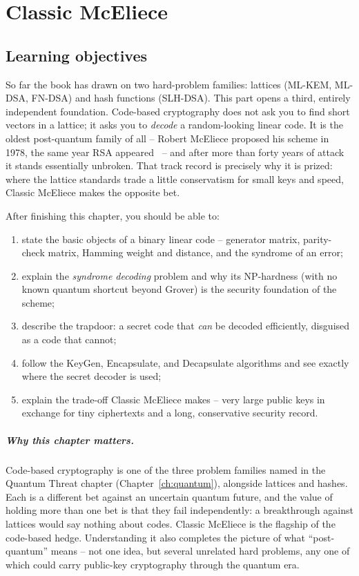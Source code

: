 \chapter{Classic McEliece}
\label{ch:mceliece}

\section{Learning objectives}

So far the book has drawn on two hard-problem families: lattices (ML-KEM, ML-DSA, FN-DSA) and hash functions (SLH-DSA). This part opens a third, entirely independent foundation. Code-based cryptography does not ask you to find short vectors in a lattice; it asks you to \emph{decode} a random-looking linear code. It is the oldest post-quantum family of all -- Robert McEliece proposed his scheme in 1978, the same year RSA appeared~\cite{mceliece1978} -- and after more than forty years of attack it stands essentially unbroken. That track record is precisely why it is prized: where the lattice standards trade a little conservatism for small keys and speed, Classic McEliece makes the opposite bet.

After finishing this chapter, you should be able to:

\begin{enumerate}
  \item state the basic objects of a binary linear code -- generator matrix, parity-check matrix, Hamming weight and distance, and the syndrome of an error;
  \item explain the \emph{syndrome decoding} problem and why its NP-hardness (with no known quantum shortcut beyond Grover) is the security foundation of the scheme;
  \item describe the trapdoor: a secret code that \emph{can} be decoded efficiently, disguised as a code that cannot;
  \item follow the KeyGen, Encapsulate, and Decapsulate algorithms and see exactly where the secret decoder is used;
  \item explain the trade-off Classic McEliece makes -- very large public keys in exchange for tiny ciphertexts and a long, conservative security record.
\end{enumerate}

\paragraph{Why this chapter matters.}
Code-based cryptography is one of the three problem families named in the Quantum Threat chapter (Chapter~\ref{ch:quantum}), alongside lattices and hashes. Each is a different bet against an uncertain quantum future, and the value of holding more than one bet is that they fail independently: a breakthrough against lattices would say nothing about codes. Classic McEliece is the flagship of the code-based hedge. Understanding it also completes the picture of what ``post-quantum'' means -- not one idea, but several unrelated hard problems, any one of which could carry public-key cryptography through the quantum era.

